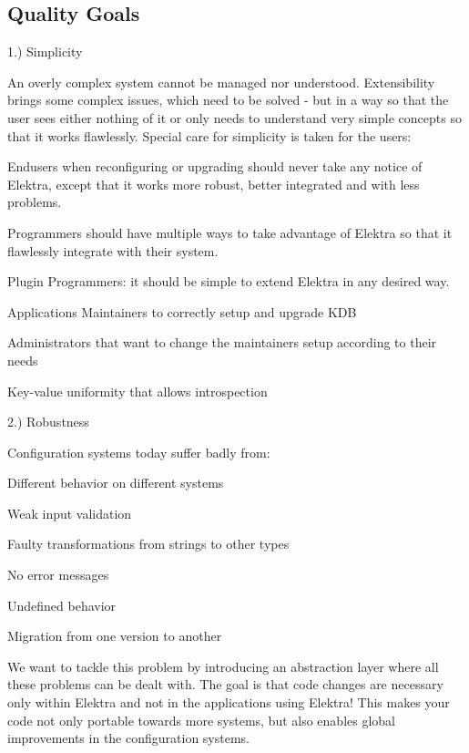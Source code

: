 \subsection*{Quality Goals}

1.) Simplicity

An overly complex system cannot be managed nor understood. Extensibility brings some complex issues, which need to be solved -\/ but in a way so that the user sees either nothing of it or only needs to understand very simple concepts so that it works flawlessly. Special care for simplicity is taken for the users\+:


\begin{DoxyItemize}
\item Endusers when reconfiguring or upgrading should never take any notice of Elektra, except that it works more robust, better integrated and with less problems.
\item Programmers should have multiple ways to take advantage of Elektra so that it flawlessly integrate with their system.
\item Plugin Programmers\+: it should be simple to extend Elektra in any desired way.
\item Application\textquotesingle{}s Maintainers to correctly setup and upgrade K\+DB
\item Administrators that want to change the maintainers\textquotesingle{} setup according to their needs
\item Key-\/value uniformity that allows introspection
\end{DoxyItemize}

2.) Robustness

Configuration systems today suffer badly from\+:


\begin{DoxyItemize}
\item Different behavior on different systems
\item Weak input validation
\item Faulty transformations from strings to other types
\item No error messages
\item Undefined behavior
\item Migration from one version to another
\end{DoxyItemize}

We want to tackle this problem by introducing an abstraction layer where all these problems can be dealt with. The goal is that code changes are necessary only within Elektra and not in the applications using Elektra! This makes your code not only portable towards more systems, but also enables global improvements in the configuration systems.

